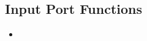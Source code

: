 \documentclass{article}
\begin{document}
    \subsection*{Input Port Functions}
    \begin{itemize}
        \item 
    \end{itemize}
\end{document}
